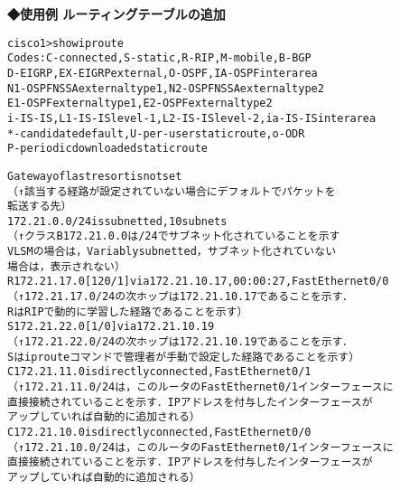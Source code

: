 {\bf ◆使用例    ルーティングテーブルの追加}
\begin{center}
\begin{breakbox}
\begin{alltt}
cisco1>show ip route
Codes: C - connected, S - static, R - RIP, M - mobile, B - BGP
       D - EIGRP, EX - EIGRP external, O - OSPF, IA - OSPF inter area
       N1 - OSPF NSSA external type 1, N2 - OSPF NSSA external type 2
       E1 - OSPF external type 1, E2 - OSPF external type 2
       i - IS-IS, L1 - IS-IS level-1, L2 - IS-IS level-2, ia - IS-IS inter area
       * - candidate default, U - per-user static route, o - ODR
       P - periodic downloaded static route

Gateway of last resort is not set
                （↑該当する経路が設定されていない場合にデフォルトでパケットを
                    転送する先）
     172.21.0.0/24 is subnetted, 10 subnets
                （↑クラスB 172.21.0.0 は /24 でサブネット化されていることを示す
                    VLSM の場合は，Variably subnetted，サブネット化されていない
                    場合は，表示されない）
R       172.21.17.0 [120/1] via 172.21.10.17, 00:00:27, FastEthernet0/0
                （↑172.21.17.0/24 の次ホップは 172.21.10.17 であることを示す．
                    R は RIP で動的に学習した経路であることを示す）
S       172.21.22.0 [1/0] via 172.21.10.19
                （↑172.21.22.0/24 の次ホップは 172.21.10.19 であることを示す．
                    S は ip route コマンドで管理者が手動で設定した経路であることを示す）
C       172.21.11.0 is directly connected, FastEthernet0/1
                （↑172.21.11.0/24 は，このルータの FastEthernet0/1 インターフェースに
                    直接接続されていることを示す．IP アドレスを付与したインターフェースが
                    アップしていれば自動的に追加される）
C       172.21.10.0 is directly connected, FastEthernet0/0
                （↑172.21.10.0/24 は，このルータの FastEthernet0/1 インターフェースに
                    直接接続されていることを示す．IP アドレスを付与したインターフェースが
                    アップしていれば自動的に追加される）
\end{alltt}
\end{breakbox}
\end{center}

